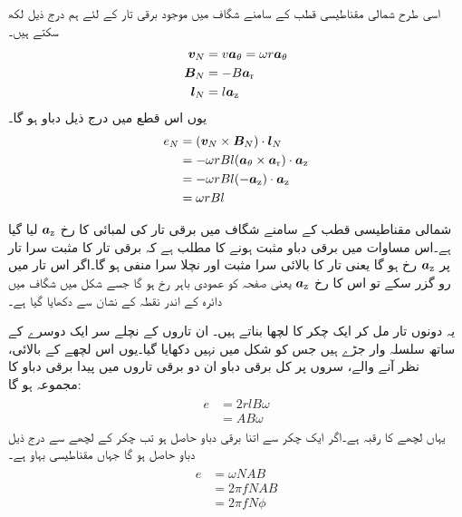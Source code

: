 اسی طرح شمالی مقناطیسی قطب کے سامنے شگاف میں موجود برقی تار کے لئے ہم درج ذیل لکھ سکتے ہیں۔
\begin{gather}
\begin{aligned}
{\ensuremath{{\boldsymbol{v}}}}_N&=v {\boldsymbol{a}}_{\theta}=\omega r{\boldsymbol{a}}_{\theta}\\
{{\boldsymbol{B}}}_N&=-B {\boldsymbol{a}}_{\textup{r}}\\
{{\boldsymbol{l}}}_N&=l {\boldsymbol{a}}_{\textup{z}}
\end{aligned}
\end{gather}
یوں اس قطع میں درج ذیل دباو ہو گا۔
\begin{gather}
\begin{aligned}
e_N&=({{\boldsymbol{v}}}_N \times {\ensuremath{{\boldsymbol{B}}}}_N)\cdot {\ensuremath{{\boldsymbol{l}}}}_N\\
&=-\omega rB l ({\boldsymbol{a}}_{\theta} \times {\boldsymbol{a}}_{\textup{r}}) \cdot {\boldsymbol{a}}_{\textup{z}}\\
&=-\omega r B l (-{\boldsymbol{a}}_{\textup{z}}) \cdot {\boldsymbol{a}}_{\textup{z}}\\
&=\omega r B l 
\end{aligned}
\end{gather}

شمالی مقناطیسی قطب کے سامنے شگاف میں برقی تار کی لمبائی کا رخ ${\boldsymbol{a}}_{\textup{z}}$ لیا گیا ہے۔اس مساوات میں برقی دباو  مثبت ہونے کا مطلب ہے کہ برقی تار کا مثبت سرا تار پر  ${\boldsymbol{a}}_{\textup{z}}$ رخ ہو گا یعنی تار کا بالائی سرا مثبت اور نچلا  سرا منفی ہو گا۔اگر اس تار میں  رو گزر سکے تو اس کا رخ ${\boldsymbol{a}}_{\textup{z}}$ یعنی صفحہ کو عمودی  باہر رخ ہو گا جسے شکل  میں  شگاف میں دائرہ کے اندر نقطہ کے نشان سے دکھایا گیا ہے۔ 

یہ دونوں  تار مل کر ایک چکر کا لچھا بناتے ہیں۔ ان تاروں  کے نچلے سر ایک دوسرے کے ساتھ سلسلہ وار جڑے ہیں جس کو شکل میں نہیں دکھایا گیا۔یوں اس لچھے کے بالائی،  نظر آنے والے،  سروں پر کل برقی دباو  ان دو برقی تاروں میں پیدا برقی دباو  کا مجموعہ ہو گا:
\begin{gather}
\begin{aligned}
e&=2r l B \omega\\
&=A B \omega
\end{aligned}
\end{gather}
یہاں لچھے کا رقبہ   ہے۔اگر ایک چکر سے اتنا برقی دباو حاصل ہو تب  چکر کے لچھے  سے درج ذیل دباو حاصل ہو گا جہاں  مقناطیسی بہاو ہے۔
\begin{gather}
\begin{aligned}\label{مساوات_گھومتے_مشین_پیدا_دباو}
e&=\omega N A B\\
&=2 \pi f N A B\\
&=2 \pi f N \phi
\end{aligned}
\end{gather}

